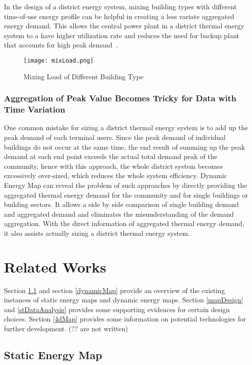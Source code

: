 \documentclass[hidelinks,12pt]{article}
\newcommand{\grey}[1]{\textcolor{black!30}{#1}}
\begin{document}
In the design of a district energy system, mixing building types with
different time-of-use energy profile can be helpful in creating a less
variate aggregated energy demand. This allows the central power plant
in a district thermal energy system to a have higher utilization rate
and reduces the need for backup plant that accounts for high peak
demand~\cite{decentralHeatMap2011}.

\begin{figure}[h!]
  \centering
  \texttt{[image: mixLoad.png]}
  \caption{Mixing Load of Different Building
    Type~\cite{decentralHeatMap2011}}
  \label{fig:mixLoad}
\end{figure}

\subsubsection{Aggregation of Peak Value Becomes Tricky for Data with Time Variation}
One common mistake for sizing a district thermal energy system is to
add up the peak demand of each terminal users. Since the peak demand
of individual buildings do not occur at the same time, the end result
of summing up the peak demand at each end point exceeds the actual
total demand peak of the community, hence with this approach, the
whole district system becomes excessively over-sized, which reduces
the whole system efficiency. Dynamic Energy Map can reveal the problem
of such approaches by directly providing the aggregated thermal energy
demand for the community and for single buildings or building
sectors. It allows a side by side comparison of single building demand
and aggregated demand and eliminates the misunderstanding of the
demand aggregation. With the direct information of aggregated thermal
energy demand, it also assists actually sizing a district thermal
energy system.

\newpage
\section{Related Works}
Section \ref{staticEnergyMap} and section \ref{dynamicMap} provide an
overview of the existing instances of static energy maps and dynamic
energy maps. Section \ref{mapDesign} and \ref{stDataAnalysis} provides
some supporting evidences for certain design choices. Section
\ref{4dMap} provides some information on potential technologies for
further development. \grey{(?? are not written)}

\subsection{Static Energy Map}\label{staticEnergyMap}
\end{document}
